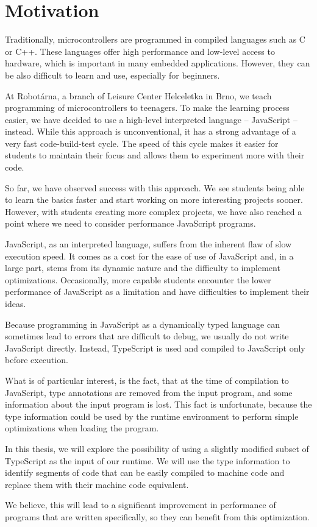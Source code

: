 \chapter{Motivation}

Traditionally, microcontrollers are programmed in compiled languages such as C or C++. These languages offer high performance and low-level access to hardware, which is important in many embedded applications. However, they can be also difficult to learn and use, especially for beginners.

At Robotárna, a branch of Leisure Center Helceletka in Brno, we teach programming of microcontrollers to teenagers. To make the learning process easier, we have decided to use a high-level interpreted language -- JavaScript -- instead. While this approach is unconventional, it has a strong advantage of a very fast code-build-test cycle. The speed of this cycle makes it easier for students to maintain their focus and allows them to experiment more with their code.

So far, we have observed success with this approach. We see students being able to learn the basics faster and start working on more interesting projects sooner. However, with students creating more complex projects, we have also reached a point where we need to consider performance JavaScript programs.

JavaScript, as an interpreted language, suffers from the inherent flaw of slow execution speed. It comes as a cost for the ease of use of JavaScript and, in a large part, stems from its dynamic nature and the difficulty to implement optimizations. Occasionally, more capable students encounter the lower performance of JavaScript as a limitation and have difficulties to implement their ideas.

Because programming in JavaScript as a dynamically typed language can sometimes lead to errors that are difficult to debug, we usually do not write JavaScript directly. Instead, TypeScript is used and compiled to JavaScript only before execution.

What is of particular interest, is the fact, that at the time of compilation to JavaScript, type annotations are removed from the input program, and some information about the input program is lost. This fact is unfortunate, because the type information could be used by the runtime environment to perform simple optimizations when loading the program.

In this thesis, we will explore the possibility of using a slightly modified subset of TypeScript as the input of our runtime. We will use the type information to identify segments of code that can be easily compiled to machine code and replace them with their machine code equivalent.

We believe, this will lead to a significant improvement in performance of programs that are written specifically, so they can benefit from this optimization.
